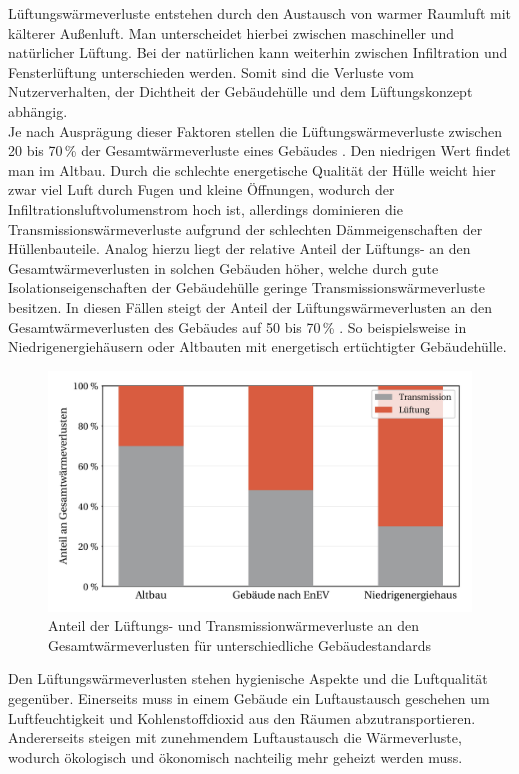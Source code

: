 Lüftungswärmeverluste entstehen durch den Austausch von warmer Raumluft mit kälterer Außenluft.
Man unterscheidet hierbei zwischen maschineller und natürlicher Lüftung.
Bei der natürlichen kann weiterhin zwischen Infiltration und Fensterlüftung unterschieden werden.
Somit sind die Verluste vom Nutzerverhalten, der Dichtheit der Gebäudehülle und dem Lüftungskonzept abhängig. \cite{Maas.2017}\\
Je nach Ausprägung dieser Faktoren stellen die Lüftungswärmeverluste zwischen 20 bis 70\,\% der Gesamtwärmeverluste eines Gebäudes \cite{Milles.2011}. 
Den niedrigen Wert findet man im Altbau. 
Durch die schlechte energetische Qualität der Hülle weicht hier zwar viel Luft durch Fugen und kleine Öffnungen, wodurch der Infiltrationsluftvolumenstrom hoch ist, allerdings dominieren die Transmissionswärmeverluste aufgrund der schlechten Dämmeigenschaften der Hüllenbauteile.
Analog hierzu liegt der relative Anteil der Lüftungs- an den Gesamtwärmeverlusten in solchen Gebäuden höher, welche durch gute Isolationseigenschaften der Gebäudehülle geringe Transmissionswärmeverluste besitzen.
In diesen Fällen steigt der Anteil der Lüftungswärmeverlusten an den Gesamtwärmeverlusten des Gebäudes auf 50 bis 70\,\% \cite{Milles.2011}.
So beispielsweise in Niedrigenergiehäusern oder Altbauten mit energetisch ertüchtigter Gebäudehülle. \cite{BorschLaaks.2011}

\begin{figure}[h]
	\centering
		\includegraphics{Pictures/LueftungswaermeverlusteWohngebaeude.jpg}
	\caption{Anteil der Lüftungs- und Transmissionwärmeverluste an den Gesamtwärmeverlusten für unterschiedliche Gebäudestandards \cite{BorschLaaks.2011}}
	\label{fig: Abbildung331} 
\end{figure}


Den Lüftungswärmeverlusten stehen hygienische Aspekte und die Luftqualität gegenüber.
Einerseits muss in einem Gebäude ein Luftaustausch geschehen um Luftfeuchtigkeit und Kohlenstoffdioxid aus den Räumen abzutransportieren.
Andererseits steigen mit zunehmendem Luftaustausch die Wärmeverluste, wodurch ökologisch und ökonomisch nachteilig mehr geheizt werden muss. 

